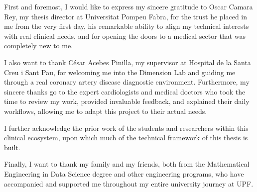 
\noindent
First and foremost, I would like to express my sincere gratitude to Oscar Camara Rey, my thesis director at Universitat Pompeu Fabra, for the trust he placed in me from the very first day, his remarkable ability to align my technical interests with real clinical needs, and for opening the doors to a medical sector that was completely new to me.

\vspace{0.5em}
\noindent
I also want to thank César Acebes Pinilla, my supervisor at Hospital de la Santa Creu i Sant Pau, for welcoming me into the Dimension Lab and guiding me through a real coronary artery disease diagnostic environment. Furthermore, my sincere thanks go to the expert cardiologists and medical doctors who took the time to review my work, provided invaluable feedback, and explained their daily workflows, allowing me to adapt this project to their actual needs.

\vspace{0.5em}
\noindent
I further acknowledge the prior work of the students and researchers within this clinical ecosystem, upon which much of the technical framework of this thesis is built.

\vspace{0.5em}
\noindent
Finally, I want to thank my family and my friends, both from the Mathematical Engineering in Data Science degree and other engineering programs, who have accompanied and supported me throughout my entire university journey at UPF.
